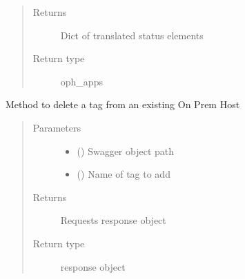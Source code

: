 \documentclass[letterpaper,10pt,english]{sphinxmanual}
\begin{document}
\begin{fulllineitems}
\begin{fulllineitems}
\begin{quote}
\begin{description}
\item[{Returns}] \leavevmode
\sphinxAtStartPar
Dict of translated status elements

\item[{Return type}] \leavevmode
\sphinxAtStartPar
oph\_apps

\end{description}\end{quote}

\end{fulllineitems}


\begin{fulllineitems}
\label{\detokenize{b1oph-class:bloxone.b1oph.oph_delete_tag}}
\sphinxAtStartPar
Method to delete a tag from an existing On Prem Host
\begin{quote}\begin{description}
\item[{Parameters}] \leavevmode\begin{itemize}
\item {} 
\sphinxAtStartPar
{} () \textendash{} Swagger object path

\item {} 
\sphinxAtStartPar
{} () \textendash{} Name of tag to add

\end{itemize}

\item[{Returns}] \leavevmode
\sphinxAtStartPar
Requests response object

\item[{Return type}] \leavevmode
\sphinxAtStartPar
response object

\end{description}\end{quote}

\end{fulllineitems}



\end{fulllineitems}
\end{document}
